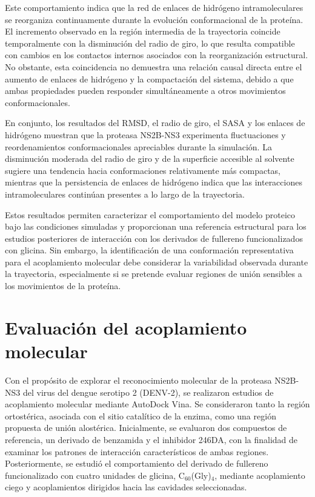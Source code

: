 Este comportamiento indica que la red de enlaces
de hidrógeno intramoleculares se reorganiza
continuamente durante la evolución conformacional
de la proteína. El incremento observado en la
región intermedia de la trayectoria coincide
temporalmente con la disminución del radio de
giro, lo que resulta compatible con cambios en
los contactos internos asociados con la
reorganización estructural. No obstante, esta
coincidencia no demuestra una relación causal
directa entre el aumento de enlaces de hidrógeno
y la compactación del sistema, debido a que ambas
propiedades pueden responder simultáneamente
a otros movimientos conformacionales.

En conjunto, los resultados del RMSD, el radio de
giro, el SASA y los enlaces de hidrógeno muestran
que la proteasa NS2B-NS3 experimenta fluctuaciones
y reordenamientos conformacionales apreciables
durante la simulación. La disminución moderada
del radio de giro y de la superficie accesible
al solvente sugiere una tendencia hacia
conformaciones relativamente más compactas,
mientras que la persistencia de enlaces de
hidrógeno indica que las interacciones
intramoleculares continúan presentes a lo
largo de la trayectoria.

Estos resultados permiten caracterizar el
comportamiento del modelo proteico bajo las
condiciones simuladas y proporcionan una
referencia estructural para los estudios
posteriores de interacción con los derivados
de fullereno funcionalizados con glicina.
Sin embargo, la identificación de una
conformación representativa para el
acoplamiento molecular debe considerar la
variabilidad observada durante la trayectoria,
especialmente si se pretende evaluar regiones
de unión sensibles a los movimientos
de la proteína.



\section{Evaluación del acoplamiento molecular}
\label{sec:acoplamiento_molecular}

Con el propósito de explorar el reconocimiento molecular de la proteasa NS2B-NS3 del virus del dengue serotipo 2 (DENV-2), se realizaron estudios de acoplamiento molecular mediante AutoDock Vina. Se consideraron tanto la región ortostérica, asociada con el sitio catalítico de la enzima, como una región propuesta de unión alostérica. Inicialmente, se evaluaron dos compuestos de referencia, un derivado de benzamida y el inhibidor 246DA, con la finalidad de examinar los patrones de interacción característicos de ambas regiones. Posteriormente, se estudió el comportamiento del derivado de fullereno funcionalizado con cuatro unidades de glicina, C$_{60}$(Gly)$_4$, mediante acoplamiento ciego y acoplamientos dirigidos hacia las cavidades seleccionadas.

